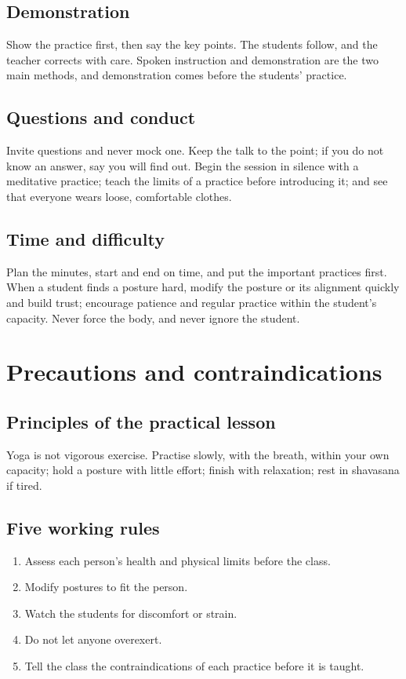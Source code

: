 \subsection*{Demonstration}
Show the practice first, then say the key points. The students follow, and the teacher corrects with care. Spoken instruction and demonstration are the two main methods, and demonstration comes before the students' practice.

\subsection*{Questions and conduct}
Invite questions and never mock one. Keep the talk to the point; if you do not know an answer, say you will find out. Begin the session in silence with a meditative practice; teach the limits of a practice before introducing it; and see that everyone wears loose, comfortable clothes.

\subsection*{Time and difficulty}
Plan the minutes, start and end on time, and put the important practices first. When a student finds a posture hard, modify the posture or its alignment quickly and build trust; encourage patience and regular practice within the student's capacity. Never force the body, and never ignore the student.


\section{Precautions and contraindications}

\subsection*{Principles of the practical lesson}
Yoga is not vigorous exercise. Practise slowly, with the breath, within your own capacity; hold a posture with little effort; finish with relaxation; rest in shavasana if tired.

\subsection*{Five working rules}
\begin{enumerate}
\item Assess each person's health and physical limits before the class.
\item Modify postures to fit the person.
\item Watch the students for discomfort or strain.
\item Do not let anyone overexert.
\item Tell the class the contraindications of each practice before it is taught.
\end{enumerate}

